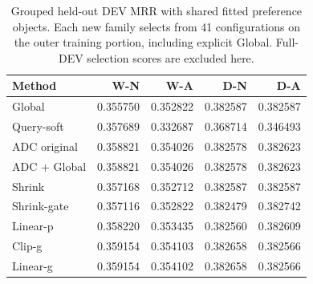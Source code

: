 \begin{table}[htbp]
\centering\footnotesize
\setlength{\tabcolsep}{4pt}
\caption{Grouped held-out DEV MRR with shared fitted preference objects. Each new family selects from 41 configurations on the outer training portion, including explicit Global. Full-DEV selection scores are excluded here.}
\label{tab:matched-dev}
\begin{tabular}{lrrrr}
\toprule
Method & W-N & W-A & D-N & D-A\\
\midrule
Global & 0.355750 & 0.352822 & 0.382587 & 0.382587\\
Query-soft & 0.357689 & 0.332687 & 0.368714 & 0.346493\\
ADC original & 0.358821 & 0.354026 & 0.382578 & 0.382623\\
ADC + Global & 0.358821 & 0.354026 & 0.382578 & 0.382623\\
Shrink & 0.357168 & 0.352712 & 0.382587 & 0.382587\\
Shrink-gate & 0.357116 & 0.352822 & 0.382479 & 0.382742\\
Linear-p & 0.358220 & 0.353435 & 0.382560 & 0.382609\\
Clip-g & 0.359154 & 0.354103 & 0.382658 & 0.382566\\
Linear-g & 0.359154 & 0.354102 & 0.382658 & 0.382566\\
\bottomrule
\end{tabular}
\end{table}
